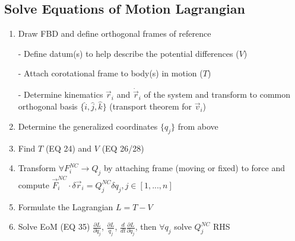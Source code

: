 \documentclass[conference]{IEEEtran}
\begin{document}
\subsection{Solve Equations of Motion Lagrangian}
\begin{enumerate}
    \item Draw FBD and define orthogonal frames of reference
    
    - Define datum(s) to help describe the potential differences ($V$)
    
    - Attach corotational frame to body(s) in motion ($T$)
   
    - Determine kinematics $\vec{r}_i$ and $\dot{\vec{r}}_i$ of the system and transform to common orthogonal basis $\{\hat{i}, \hat{j}, \hat{k}\}$ (transport theorem for $\vec{v}_i$)
    \item Determine the generalized coordinates $\{q_j\}$ from above
    \item Find $T$ (EQ 24) and $V$ (EQ 26/28)
    \item Transform $\forall F_i^{NC} \to Q_j$ by attaching frame (moving or fixed) to force and compute $\vec{F}_i^{NC} \cdot \delta \vec{r}_i = Q_j^{NC} \delta q_j, j \in [1, ..., n]$ 
    \item Formulate the Lagrangian $L = T - V$
    \item Solve EoM (EQ 35) $\frac{\partial L}{\partial \dot{q}_j}$, $\frac{\partial L}{q_j}$, $\frac{d}{dt}\frac{\partial L}{\partial \dot{q}_j}$, then $\forall q_j$ solve $Q^{NC}_j$ RHS
\end{enumerate}
\end{document}

